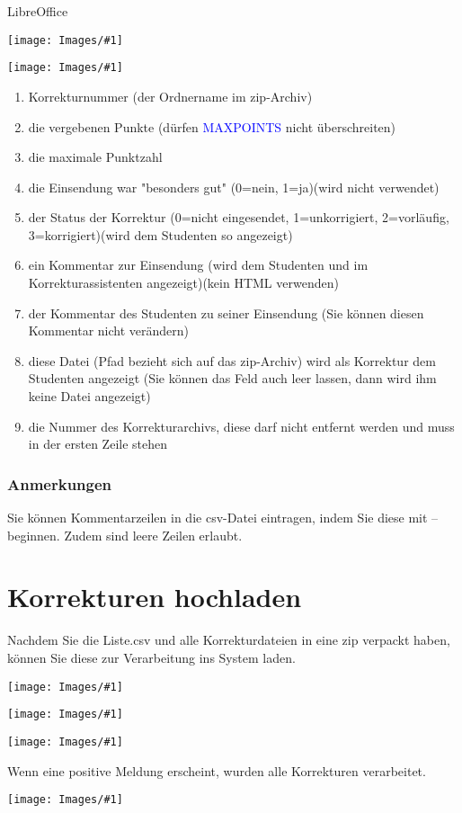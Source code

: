 \documentclass[a4paper,final, parskip]{scrartcl}
\numberwithin{equation}{section}
\newcommand{\blau}[1]{\textcolor{blue}{#1}}
\newenvironment{Bilder}
  {\par\raggedbottom\null\noindent\minipage{\textwidth}\centering}
  {\endminipage\vspace{0.7cm}}
\newcommand{\tbild}[1]{
\begin{Bilder}
 \texttt{[image: Images/\#1]}
	\end{Bilder}
}
\newcommand{\gbild}[2]{
\begin{Bilder}	
    \centering
    #2
	\begin{minipage}{\linewidth}
    \centering
       \texttt{[image: Images/\#1]}
  \end{minipage}
	\end{Bilder}
}
\begin{document}
\gbild{libreA.png}{LibreOffice}

\tbild{libreB.png}
\begin{enumerate}
\item Korrekturnummer (der Ordnername im zip-Archiv)
\item die vergebenen Punkte (dürfen \blau{MAXPOINTS} nicht überschreiten)
\item die maximale Punktzahl
\item die Einsendung war "besonders gut" (0=nein, 1=ja)(wird nicht verwendet)
\item der Status der Korrektur (0=nicht eingesendet, 1=unkorrigiert, 2=vorläufig, 3=korrigiert)(wird dem Studenten so angezeigt)
\item ein Kommentar zur Einsendung (wird dem Studenten und im Korrekturassistenten angezeigt)(kein HTML verwenden)
\item der Kommentar des Studenten zu seiner Einsendung (Sie können diesen Kommentar nicht verändern)
\item diese Datei (Pfad bezieht sich auf das zip-Archiv) wird als Korrektur dem Studenten angezeigt (Sie können das Feld auch leer lassen, dann wird ihm keine Datei angezeigt)
\item die Nummer des Korrekturarchivs, diese darf nicht entfernt werden und muss in der ersten Zeile stehen
\end{enumerate}

\subsubsection*{Anmerkungen}
Sie können Kommentarzeilen in die csv-Datei eintragen, indem Sie diese mit -- beginnen. Zudem sind leere Zeilen erlaubt.

\newpage
\section{Korrekturen hochladen}
Nachdem Sie die Liste.csv und alle Korrekturdateien in eine zip verpackt haben, können Sie diese zur Verarbeitung ins System laden.
\tbild{uploadA.png}
\tbild{uploadB.png}
\tbild{uploadC.png}

Wenn eine positive Meldung erscheint, wurden alle Korrekturen verarbeitet.
\tbild{uploadD.png}
\end{document}
